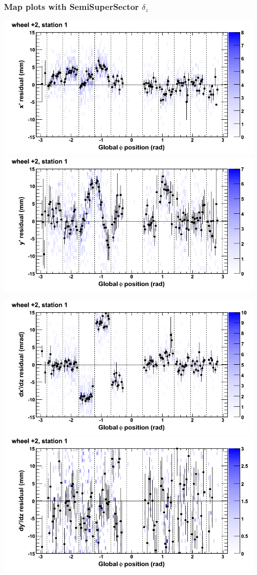 \documentclass[compress]{beamer}
\begin{document}
\begin{frame}
\frametitle{Map plots with SemiSuperSector $\delta_z$}
\includegraphics[width=0.5\linewidth]{zfit_mapplots/DTvsphi_st1whE_x.png}
\includegraphics[width=0.5\linewidth]{zfit_mapplots/DTvsphi_st1whE_y.png}

\includegraphics[width=0.5\linewidth]{zfit_mapplots/DTvsphi_st1whE_dxdz.png}
\includegraphics[width=0.5\linewidth]{zfit_mapplots/DTvsphi_st1whE_dydz.png}
\end{frame}
\end{document}
